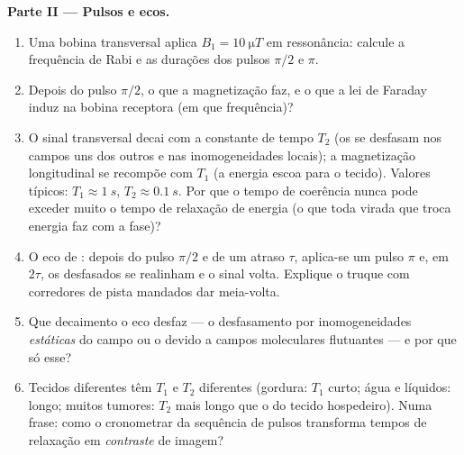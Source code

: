 \begin{problem}
\medskip\noindent\textbf{Parte II --- Pulsos e ecos.}
\begin{enumerate}[resume]
  \item Uma bobina transversal aplica $B_1 = \qty{10}{\micro T}$ em
        ressonância: calcule a frequência de Rabi e as durações dos
        pulsos $\pi/2$ e $\pi$.
  \item Depois do pulso $\pi/2$, o que a magnetização faz, e o que a
        lei de Faraday induz na bobina receptora (em que frequência)?
  \item O sinal transversal decai com a constante de tempo $T_2$ (os
         se desfasam nos campos uns dos outros e nas
        inomogeneidades locais); a magnetização longitudinal se
        recompõe com $T_1$ (a energia escoa para o tecido). Valores
        típicos: $T_1 \approx \qty{1}{s}$, $T_2 \approx \qty{0.1}{s}$.
        Por que o tempo de coerência nunca pode exceder muito o tempo
        de relaxação de energia (o que toda virada que troca energia
        faz com a fase)?
  \item O eco de : depois do pulso $\pi/2$ e de um atraso $\tau$,
        aplica-se um pulso $\pi$ e, em $2\tau$, os  desfasados se
        realinham e o sinal volta. Explique o truque com corredores de
        pista mandados dar meia-volta.
  \item Que decaimento o eco desfaz --- o desfasamento por
        inomogeneidades \emph{estáticas} do campo ou o devido a campos
        moleculares flutuantes --- e por que só esse?
  \item Tecidos diferentes têm $T_1$ e $T_2$ diferentes (gordura:
        $T_1$ curto; água e líquidos: longo; muitos tumores: $T_2$
        mais longo que o do tecido hospedeiro). Numa frase: como o
        cronometrar da sequência de pulsos transforma tempos de
        relaxação em \emph{contraste} de imagem?
\end{enumerate}


\end{problem}
